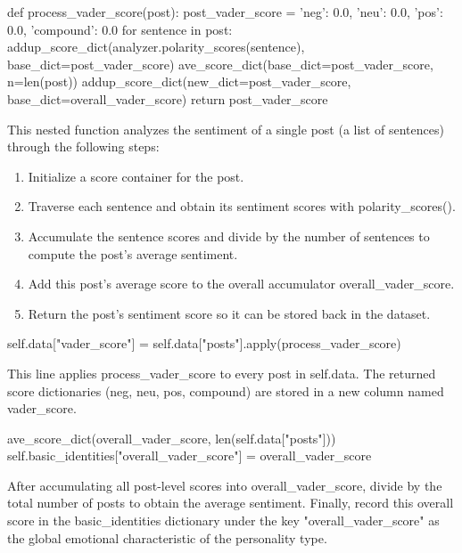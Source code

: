 \documentclass[12pt]{article}
\begin{document}
	\begin{python}
def process_vader_score(post):
    post_vader_score = {'neg': 0.0, 'neu': 0.0, 'pos': 0.0, 'compound': 0.0}
    for sentence in post:
        addup_score_dict(analyzer.polarity_scores(sentence), base_dict=post_vader_score)
    ave_score_dict(base_dict=post_vader_score, n=len(post))
    addup_score_dict(new_dict=post_vader_score, base_dict=overall_vader_score)
    return post_vader_score
	\end{python}
	This nested function analyzes the sentiment of a single post (a list of sentences) through the following steps:
	\begin{enumerate}
	\item Initialize a score container for the post.
	\item Traverse each sentence and obtain its sentiment scores with polarity\_scores().
	\item Accumulate the sentence scores and divide by the number of sentences to compute the post’s average sentiment.
	\item Add this post’s average score to the overall accumulator overall\_vader\_score.
	\item Return the post’s sentiment score so it can be stored back in the dataset.
	\end{enumerate}
	\begin{python}
self.data["vader_score"] = self.data["posts"].apply(process_vader_score)
	\end{python}
	This line applies process\_vader\_score to every post in self.data. The returned score dictionaries (neg, neu, pos, compound) are stored in a new column named vader\_score.
	\begin{python}
ave_score_dict(overall_vader_score, len(self.data["posts"]))
self.basic_identities["overall_vader_score"] = overall_vader_score
	\end{python}
	After accumulating all post-level scores into overall\_vader\_score, divide by the total number of posts to obtain the average sentiment. Finally, record this overall score in the basic\_identities dictionary under the key "overall\_vader\_score" as the global emotional characteristic of the personality type.
	
\end{document}

